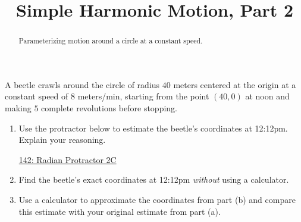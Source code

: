 \documentclass{ximera}
\title{Simple Harmonic Motion, Part 2}
\begin{document}
\begin{abstract}
Parameterizing motion around a circle at a constant speed.
\end{abstract}
\maketitle



\begin{example}  \label{Exp89dfe94tf4}

A beetle crawls around the circle of radius $40$ meters centered at the origin at a constant speed of $8$ meters/min, starting from the point $(40,0)$ at noon and making $5$ complete revolutions before stopping.

\begin{enumerate}

\item Use the protractor below to estimate the beetle's coordinates at 12:12pm. Explain your reasoning.

\begin{onlineOnly}
    \begin{center}
\end{center}
\end{onlineOnly}

\href{https://www.desmos.com/calculator/lbkveixdno}{142: Radian Protractor 2C}

\item Find the beetle's exact coordinates at 12:12pm \emph{without} using a calculator.

\item Use a calculator to approximate the coordinates from part (b) and compare this estimate with your original estimate from part (a).

\end{enumerate}

\end{example}
\end{document}
